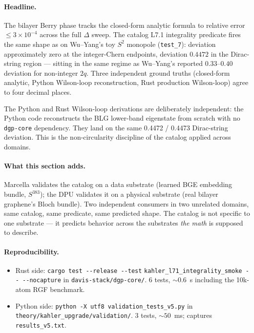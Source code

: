 \documentclass[11pt,letterpaper]{article}
\begin{document}
\paragraph{Headline.}
The bilayer Berry phase tracks the closed-form analytic formula to
relative error $\leq 3 \times 10^{-4}$ across the full $\Delta$
sweep. The catalog L7.1 integrality predicate fires the same shape
as on Wu--Yang's toy $S^2$ monopole (\texttt{test\_7}): deviation
approximately zero at the integer-Chern endpoints, deviation
$\mathbf{0.4472}$ in the Dirac-string region --- sitting in the same
regime as Wu--Yang's reported $0.33$--$0.40$ deviation for
non-integer $2q$. Three independent ground truths (closed-form
analytic, Python Wilson-loop reconstruction, Rust production
Wilson-loop) agree to four decimal places.

The Python and Rust Wilson-loop derivations are deliberately
independent: the Python code reconstructs the BLG lower-band
eigenstate from scratch with no \texttt{dgp-core} dependency. They
land on the same 0.4472 / 0.4473 Dirac-string deviation. This is the
non-circularity discipline of the catalog applied across domains.

\paragraph{What this section adds.}
Marcella validates the catalog on a data substrate (learned BGE
embedding bundle, $S^{383}$); the DPU validates it on a physical
substrate (real bilayer graphene's Bloch bundle). Two independent
consumers in two unrelated domains, same catalog, same predicate,
same predicted shape. The catalog is not specific to one substrate
--- it predicts behavior across the substrates \emph{the math} is
supposed to describe.

\paragraph{Reproducibility.}
\begin{itemize}[nosep]
\item Rust side: \verb|cargo test --release --test|
  \verb|kahler_l71_integrality_smoke -- --nocapture| in
  \texttt{davis-stack/dgp-core/}. 6 tests, $\sim 0.6$~s including
  the 10k-atom RGF benchmark.
\item Python side: \verb|python -X utf8 validation_tests_v5.py| in
  \texttt{theory/kahler\_upgrade/validation/}. 3 tests,
  $\sim 50$~ms; captures \texttt{results\_v5.txt}.
\end{itemize}
\end{document}
